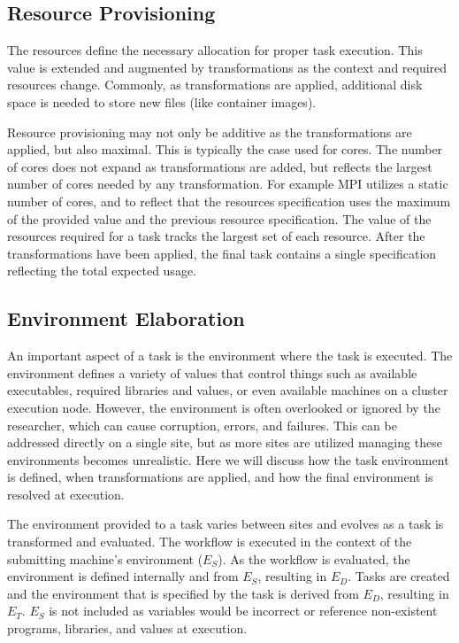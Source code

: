 \documentclass[conference]{IEEEtran}
\begin{document}
\subsection{Resource Provisioning}

The resources define the necessary allocation for proper task execution. 
This value is extended and augmented by transformations 
as the context and required resources change.
Commonly, as transformations are applied, 
additional disk space is needed to store new files
(like container images). 

Resource provisioning may not only be additive 
as the transformations are applied,
but also maximal.
This is typically the case used for cores.
The number of cores does not expand as
transformations are added, but reflects
the largest number of cores needed by any
transformation.
For example MPI utilizes a static number of cores, 
and to reflect that the resources specification
uses the maximum of the provided value and the previous
resource specification. 
The value of the resources required for a task 
tracks the largest set of each resource.
After the transformations have been applied, 
the final task contains a single specification 
reflecting the total expected usage.



\subsection{Environment Elaboration}


An important aspect of a task is the environment
where the task is executed.
The environment defines a variety of values
that control things such as available executables,
required libraries and values,
or even available machines on a cluster execution node.
However, the environment is often overlooked
or ignored by the researcher,
which can cause corruption, errors, and failures.
This can be addressed directly on a single site,
but as more sites are utilized managing these environments
becomes unrealistic.
Here we will discuss how the task environment is defined, 
when transformations are applied, and how the
final environment is resolved at execution.

The environment provided to a task varies between sites
and evolves as a task is transformed and evaluated.
The workflow is executed in the context 
of the submitting machine's environment (${E_S}$). 
As the workflow is evaluated,
the environment is defined internally and from ${E_S}$,
resulting in ${E_D}$.
Tasks are created and 
the environment that is specified by the task 
is derived from ${E_D}$, resulting in ${E_T}$. 
${E_S}$ is not included as variables would be
incorrect or reference non-existent programs, libraries, and values
at execution.
\end{document}
